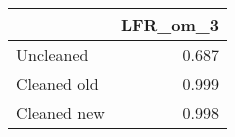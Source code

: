 \begin{tabular}{lr}
\toprule
{} & LFR_om_3 \\
\midrule
Uncleaned   &    0.687 \\
Cleaned old &    0.999 \\
Cleaned new &    0.998 \\
\bottomrule
\end{tabular}
